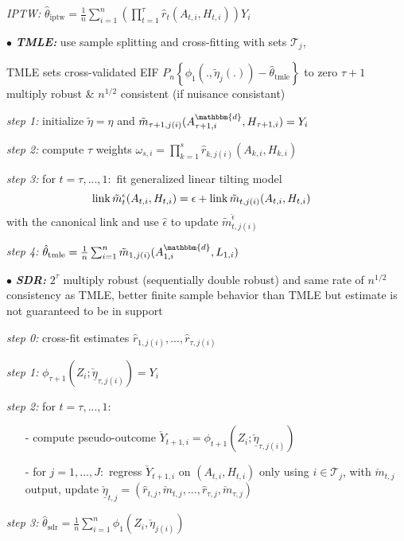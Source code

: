 \documentclass[8pt,twoside]{extarticle}
\begin{document}
\begin{multicols}{2}
\noindent \textit{IPTW:} $\hat{\theta}_{\text{iptw}}=\frac{1}{n} \sum_{i=1}^n \left(\prod_{t=1}^\tau \hat{r}_t(A_{t,i},H_{t,i})\right)Y_i$



\noindent $\bullet$ \textit{\textbf{TMLE:}} use sample splitting and cross-fitting with sets $\mathcal{T}_j$,

\noindent TMLE sets cross-validated EIF $P_n\!\left\{\phi_1(.,\tilde{\eta}_j(.)){-}\hat{\theta}_{\text{tmle}}\right\} $ to zero 
$\tau{+}1$ multiply robust \& $n^{1/2}$ consistent (if nuisance consistant)


\noindent \textit{step 1:} initialize $\tilde{\eta} = \hat{\eta}$ and $\tilde{m}_{\tau+1,j(i)}(A_{\tau+1,i}^{\mathbbm{d}},H_{\tau+1,i}) = Y_i$

\noindent \textit{step 2:} compute $\tau$ weights $\omega_{s,i}=\prod_{k=1}^s \hat{r}_{k,j(i)}(A_{k,i},H_{k,i})$

\noindent \textit{step 3:} for $t=\tau,...,1:$ fit generalized linear tilting model 
$$\hspace{-1em}\mathrm{link}\, \tilde{m}_{t}^\epsilon(A_{t,i},H_{t,i}) = \epsilon + \mathrm{link} \,\tilde{m}_{t,j(i)}(A_{t,i},H_{t,i})$$ with the canonical link and use $\hat{\epsilon}$ to update $\tilde{m}_{t, j(i)}^{\hat{\epsilon}}$

\noindent \textit{step 4:} $\hat{\theta}_{\text{tmle}} = \frac{1}{n} \sum_{i=1}^n \tilde{m}_{1,j(i)}(A^{\mathbbm{d}}_{1,i},L_{1,i})$





\noindent $\bullet$ \textit{\textbf{SDR:}} $2^\tau$ multiply robust (sequentially double robust) and 
same rate of $n^{1/2}$ consistency as TMLE, better finite sample behavior than TMLE but estimate is not guaranteed to be in support

\noindent \textit{step 0:} cross-fit estimates $\hat{r}_{1,j(i)},..., \hat{r}_{\tau,j(i)}$


\noindent \textit{step 1:} $\phi_{\tau+1}(Z_i;\underline{\check{\eta}}_{\tau,j(i)})=Y_i$

\noindent \textit{step 2:} for $t=\tau,...,1:$
\begin{itemize}[leftmargin=*, itemsep=0em, topsep=0pt, partopsep=0pt,parsep=0pt]
\item[-] compute pseudo-outcome $\check{Y}_{t+1,i} =   \phi_{t+1}(Z_i;\underline{\check{\eta}}_{\tau,j(i)})$
\item[-] for $j=1,...,J:$ regress $\check{Y}_{t+1,i}$ on $(A_{t,i}, H_{t,i})$ only using $i \in \mathcal{T}_j$, with $\check{m}_{t,j}$ output, update $\check{\underline{\eta}}_{t,j} = (\hat{r}_{t,j},\check{m}_{t,j}, ...,\hat{r}_{\tau,j},\check{m}_{\tau,j}) $
\end{itemize}
\noindent \textit{step 3:} $\hat{\theta}_{\text{sdr}} = \frac{1}{n} \sum_{i=1}^n \phi_1(Z_i,\check{\eta}_{j(i)})$    


\end{multicols}
\end{document}
